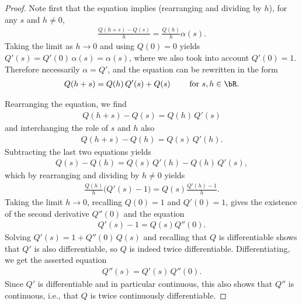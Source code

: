 \begin{proof}
  Note first that the equation implies (rearranging and dividing by $h$),
  for any $s$ and $h \ne 0$,
  \begin{align*}
    \frac{Q(h+s) - Q(s)}{h} = \frac{Q(h)}{h} \alpha(s) .
  \end{align*}
  Taking the limit as $h \to 0$ and using $Q(0)=0$ yields
  $Q'(s) = Q'(0) \, \alpha(s) = \alpha(s)$, where we also
  took into account $Q'(0) = 1$. Therefore necessarily
  $\alpha = Q'$, and the equation can be rewritten in the form
  \begin{align*}
  Q(h+s) = Q(h) \, Q'(s) + Q(s) \qquad \text{ for } s,h \in \bR .
  \end{align*}

  Rearranging the equation, we find
  \begin{align*}
    Q(h+s) - Q(s) = Q(h) \, Q'(s)
  \end{align*}
  and interchanging the role of $s$ and $h$ also
  \begin{align*}
    Q(h+s) - Q(h) = Q(s) \, Q'(h) .
  \end{align*}
  Subtracting the last two equations yields
  \begin{align*}
    Q(s) - Q(h) = Q(s) \, Q'(h) - Q(h) \, Q'(s) ,
  \end{align*}
  which by rearranging and dividing by $h \ne 0$ yields
  \begin{align*}
     \frac{Q(h)}{h} \big( Q'(s) - 1 \big) = Q(s) \frac{Q'(h) - 1}{h} .
  \end{align*}
  Taking the limit $h \to 0$, recalling $Q(0)=1$ and $Q'(0)=1$,
  gives the existence of the second derivative $Q''(0)$ and the equation
  \begin{align*}
    Q'(s) - 1 = Q(s) Q''(0) .
  \end{align*}
  Solving $Q'(s) = 1 + Q''(0) \, Q(s)$ and recalling that $Q$
  is differentiable shows that $Q'$ is also differentiable, so
  $Q$ is indeed twice differentiable. Differentiating, we get
  the asserted equation
  \begin{align*}
    Q''(s) = Q'(s) \, Q''(0) .
  \end{align*}
  Since $Q'$ is differentiable and in particular continuous, this also shows
  that $Q''$ is continuous, i.e., that $Q$ is twice continuously differentiable.
\end{proof}

